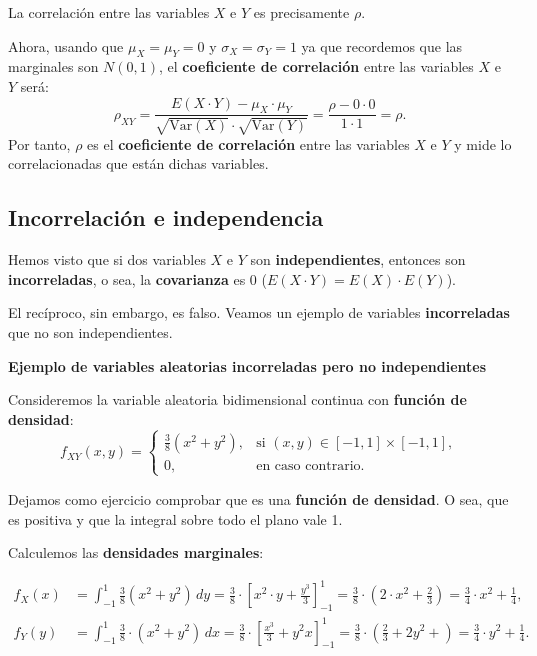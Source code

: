 \documentclass[]{book}
\begin{document}
La correlación entre las variables \(X\) e \(Y\) es precisamente \(\rho\).

Ahora, usando que \(\mu_X=\mu_Y=0\) y \(\sigma_X=\sigma_Y=1\) ya que recordemos que las marginales son \(N(0,1)\), el \textbf{coeficiente de correlación} entre las variables \(X\) e \(Y\) será:
\[
\rho_{XY}=\frac{E(X\cdot Y)-\mu_X\cdot \mu_Y}{\sqrt{\mathrm{Var}(X)}\cdot\sqrt{\mathrm{Var}(Y)}}=\frac{\rho-0\cdot 0}{1\cdot 1}=\rho.
\]
Por tanto, \(\rho\) es el \textbf{coeficiente de correlación} entre las variables \(X\) e \(Y\) y mide lo correlacionadas que están dichas variables.

\hypertarget{incorrelaciuxf3n-e-independencia}{%
\subsection{Incorrelación e independencia}\label{incorrelaciuxf3n-e-independencia}}

Hemos visto que si dos variables \(X\) e \(Y\) son \textbf{independientes}, entonces son \textbf{incorreladas}, o sea, la \textbf{covarianza} es 0 (\(E(X\cdot Y)=E(X)\cdot E(Y)\)).

El recíproco, sin embargo, es falso. Veamos un ejemplo de variables \textbf{incorreladas} que no son independientes.

\textbf{Ejemplo de variables aleatorias incorreladas pero no independientes}

Consideremos la variable aleatoria bidimensional continua con \textbf{función de densidad}:
\[
f_{XY}(x,y)=\begin{cases}
\frac{3}{8}(x^2+y^2), & \mbox{si }(x,y)\in [-1,1]\times [-1,1],\\
0, & \mbox{en caso contrario.}
\end{cases}
\]

Dejamos como ejercicio comprobar que es una \textbf{función de densidad}. O sea, que es positiva y que la integral sobre todo el plano vale 1.

Calculemos las \textbf{densidades marginales}:

\[
\begin{array}{rl}
f_X(x) & = \int_{-1}^{1} \frac{3}{8}(x^2+y^2)\, dy = \frac{3}{8}\cdot\left[x^2\cdot y+\frac{y^3}{3}\right]_{-1}^1 =\frac{3}{8}\cdot\left(2 \cdot x^2+\frac{2}{3}\right)=\frac{3}{4}
\cdot x^2+\frac{1}{4}, \\
f_Y(y) & = \int_{-1}^{1} \frac{3}{8}\cdot(x^2+y^2)\, dx = \frac{3}{8}\cdot\left[\frac{x^3}{3}+y^2 x\right]_{-1}^1 =\frac{3}{8}\cdot\left(\frac{2}{3}+2 y^2+\right)=\frac{3}{4}\cdot y^2+\frac{1}{4}.
\end{array}
\]
\end{document}
